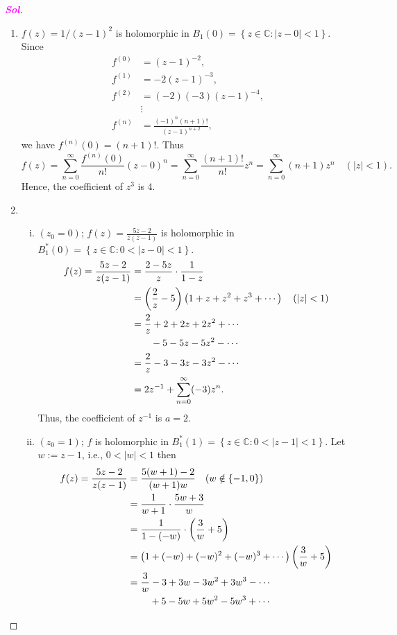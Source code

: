 \documentclass{article}
\newcommand{\ie}{\textnormal{i.e.}}
\theoremstyle{definition}
\newcommand{\set}[1]{\left\{#1\right\}}
\newcommand{\C}{\mathbb{C}}
\newcommand{\of}[1]{\left( #1 \right)}
\newcommand{\abs}[1]{\left\lvert #1 \right\rvert}
\newcommand{\sol}{\textcolor{magenta}{\bf Sol}}
\begin{document}
\begin{proof}[\sol]
	\begin{enumerate}[(1)]
		\item $f(z)=1/(z-1)^2$ is holomorphic in $B_1(0)=\set{z\in\C:\abs{z-0}<1}$. Since \begin{align*}
			f^{(0)}&=(z-1)^{-2},\\
			f^{(1)}&=-2(z-1)^{-3},\\
			f^{(2)}&=(-2)(-3)(z-1)^{-4},\\
			&\vdots\\
			f^{(n)}&=\frac{(-1)^n(n+1)!}{(z-1)^{n+2}},
		\end{align*} we have $f^{(n)}(0)=(n+1)!$. Thus \[
		f(z)=\sum_{n=0}^{\infty}\frac{f^{(n)}(0)}{n!}(z-0)^n=\sum_{n=0}^\infty \frac{(n+1)!}{n!}z^n=\sum_{n=0}^\infty (n+1)z^n\quad(\abs{z}<1).
		\] Hence, the coefficient of $z^3$ is $4$.
		\vspace{4pt}
		\item \begin{enumerate}[(i)]
			\item $(z_0=0)$; $\displaystyle f(z)=\frac{5z-2}{z(z-1)}$ is holomorphic in $B_1^*(0)=\set{z\in\C:0<\abs{z-0}<1}$. \begin{align*}
				f(z)=\frac{5z-2}{z(z-1)}&=\frac{2-5z}{z}\cdot\frac{1}{1-z}\\
				&=\of{\frac{2}{z}-5}\of{1+z+z^2+z^3+\cdots}\quad(\abs{z}<1)\\
				&=\frac{2}{z}+2+2z+2z^2+\cdots\\
				&\hspace{7mm}-5-5z-5z^2-\cdots\\
				&=\frac{2}{z}-3-3z-3z^2-\cdots\\
				&=2z^{-1}+\sum_{n=0}^{\infty}(-3)z^n.
			\end{align*}
			Thus, the coefficient of $z^{-1}$ is $a=2$.
			\item $(z_0=1)$; $f$ is holomorphic in $B_1^*(1)=\set{z\in\C:0<\abs{z-1}<1}$. Let $w:=z-1$, \ie, $0<\abs{w}<1$ then \begin{align*}
				f(z)=\frac{5z-2}{z(z-1)}&=\frac{5(w+1)-2}{(w+1)w}\quad(w\notin\set{-1,0})\\
				&=\frac{1}{w+1}\cdot\frac{5w+3}{w}\\
				&=\frac{1}{1-(-w)}\cdot\of{\frac{3}{w}+5}\\
				&=\of{1+(-w)+(-w)^2+(-w)^3+\cdots}\of{\frac{3}{w}+5}\\
				&=\frac{3}{w}-3+3w-3w^2+3w^3-\cdots\\
				&\hspace{8mm}+5-5w+5w^2-5w^3+\cdots\\

\end{align*}
\end{enumerate}
\end{enumerate}
\end{proof}
\end{document}
